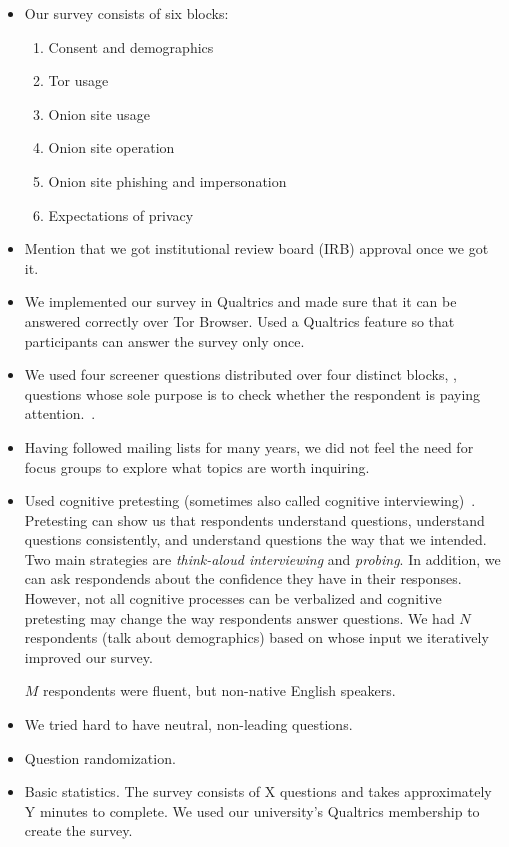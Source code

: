 \begin{itemize}
    \item Our survey consists of six blocks:
        \begin{enumerate}
            \item Consent and demographics
            \item Tor usage
            \item Onion site usage
            \item Onion site operation
            \item Onion site phishing and impersonation
            \item Expectations of privacy
        \end{enumerate}
    \item Mention that we got institutional review board (IRB) approval once we
        got it.
    \item We implemented our survey in Qualtrics and made sure that it can be
        answered correctly over Tor Browser.  Used a Qualtrics feature so that
        participants can answer the survey only once.
    \item We used four screener questions distributed over four distinct
        blocks, \ie, questions whose sole purpose is to check whether the
        respondent is paying attention.~\cite{Berinsky2014a}.
    \item Having followed mailing lists \etc for many years, we did not feel the
        need for focus groups to explore what topics are worth inquiring.
    \item Used cognitive pretesting (sometimes also called cognitive
        interviewing)~\cite{Collins2003a}.  Pretesting can show us that
        respondents \first understand questions, \second understand questions
        consistently, and \third understand questions the way that we intended.
        Two main strategies are \emph{think-aloud interviewing} and
        \emph{probing}.  In addition, we can ask respondends about the
        confidence they have in their responses.  However, not all cognitive
        processes can be verbalized and cognitive pretesting may change the way
        respondents answer questions.  We had $N$ respondents (talk about
        demographics) based on whose input we iteratively improved our survey.

        $M$ respondents were fluent, but non-native English speakers.
    \item We tried hard to have neutral, non-leading questions.
    \item Question randomization.
    \item Basic statistics.  The survey consists of X questions and takes
        approximately Y minutes to complete.  We used our university's
        Qualtrics membership to create the survey.
\end{itemize}

